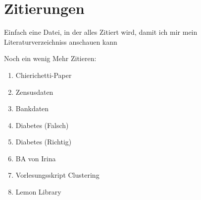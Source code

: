 
\chapter{Zitierungen}
Einfach eine Datei, in der alles Zitiert wird, damit ich mir mein Literaturverzeichniss anschauen kann

Noch ein wenig Mehr Zitieren:

\begin{enumerate}
    \item Chierichetti-Paper \cite{chierichetti2018fair}
    \item Zensusdaten \cite{misc_adult_2}
    \item Bankdaten \cite{misc_bank_marketing_222}
    \item Diabetes (Falsch) \cite{misc_diabetes_34_falsch}
    \item Diabetes (Richtig) \cite{misc_diabetes_130_richtig}
    \item BA von Irina \cite{BA_Clustering_Irina}
    \item Vorlesungsskript Clustering \cite{Clustering_Skript}
    \item Lemon Library \cite{Lemon-Lib}
\end{enumerate}
